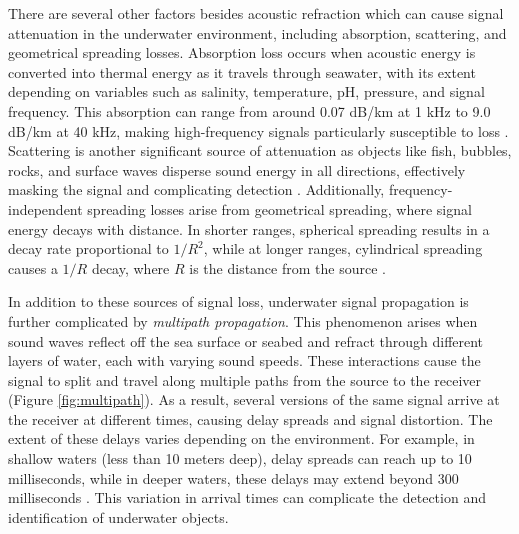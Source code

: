 There are several other factors besides acoustic refraction which can cause signal attenuation in the underwater environment, including absorption, scattering, and geometrical spreading losses. Absorption loss occurs when acoustic energy is converted into thermal energy as it travels through seawater, with its extent depending on variables such as salinity, temperature, pH, pressure, and signal frequency. This absorption can range from around 0.07 dB/km at 1 kHz to 9.0 dB/km at 40 kHz, making high-frequency signals particularly susceptible to loss \cite{bjorno_applied_2017, vaccaro_past_1998}. Scattering is another significant source of attenuation as objects like fish, bubbles, rocks, and surface waves disperse sound energy in all directions, effectively masking the signal and complicating detection \cite{bjorno_applied_2017}. Additionally, frequency-independent spreading losses arise from geometrical spreading, where signal energy decays with distance. In shorter ranges, spherical spreading results in a decay rate proportional to $1/R^2$, while at longer ranges, cylindrical spreading causes a $1/R$ decay, where $R$ is the distance from the source \cite{vaccaro_past_1998}.

In addition to these sources of signal loss, underwater signal propagation is further complicated by \textit{multipath propagation}. This phenomenon arises when sound waves reflect off the sea surface or seabed and refract through different layers of water, each with varying sound speeds. These interactions cause the signal to split and travel along multiple paths from the source to the receiver (Figure \ref{fig:multipath}). As a result, several versions of the same signal arrive at the receiver at different times, causing delay spreads and signal distortion. The extent of these delays varies depending on the environment. For example, in shallow waters (less than 10 meters deep), delay spreads can reach up to 10 milliseconds, while in deeper waters, these delays may extend beyond 300 milliseconds \cite{vaccaro_past_1998}. This variation in arrival times can complicate the detection and identification of underwater objects.


